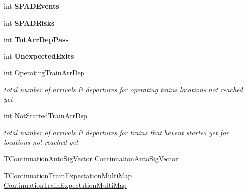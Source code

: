 \begin{DoxyCompactItemize}
\mbox{\label{class_t_train_controller_a273080615512d3a32b82a881af9dc5fb}} 
int {\bfseries S\+P\+A\+D\+Events}
\item 
\mbox{\label{class_t_train_controller_a5d93cb7e73c061071656b8fbd6bbfc72}} 
int {\bfseries S\+P\+A\+D\+Risks}
\item 
\mbox{\label{class_t_train_controller_a6bfae23b356d4450b4d93d863d876f57}} 
int {\bfseries Tot\+Arr\+Dep\+Pass}
\item 
\mbox{\label{class_t_train_controller_af64a32b0811b647196f8d25ac6701ddc}} 
int {\bfseries Unexpected\+Exits}
\item 
\mbox{\label{class_t_train_controller_a9b419c5f86d0815c35093bf3c25c6821}} 
int \mbox{\hyperlink{class_t_train_controller_a9b419c5f86d0815c35093bf3c25c6821}{Operating\+Train\+Arr\+Dep}}
\begin{DoxyCompactList}\small\item\em total number of arrivals \& departures for operating trains locations not reached yet \end{DoxyCompactList}\item 
\mbox{\label{class_t_train_controller_aa547b8fba4e19683055e67359d41a933}} 
int \mbox{\hyperlink{class_t_train_controller_aa547b8fba4e19683055e67359d41a933}{Not\+Started\+Train\+Arr\+Dep}}
\begin{DoxyCompactList}\small\item\em total number of arrivals \& departures for trains that haven\textquotesingle{}t started yet for locations not reached yet \end{DoxyCompactList}\item 
\mbox{\hyperlink{class_t_train_controller_a1908f7d1a5dcfebf2f747efbdd6f4681}{T\+Continuation\+Auto\+Sig\+Vector}} \mbox{\hyperlink{class_t_train_controller_a0b412f7b88f829632e54bffc0659ac3b}{Continuation\+Auto\+Sig\+Vector}}
\item 
\mbox{\label{class_t_train_controller_a1a8e542193d93581e0c391d8e7fa3e1b}} 
\mbox{\hyperlink{class_t_train_controller_a36525478ab0d9f59e486b8c030acd87c}{T\+Continuation\+Train\+Expectation\+Multi\+Map}} \mbox{\hyperlink{class_t_train_controller_a1a8e542193d93581e0c391d8e7fa3e1b}{Continuation\+Train\+Expectation\+Multi\+Map}}

\end{DoxyCompactItemize}

